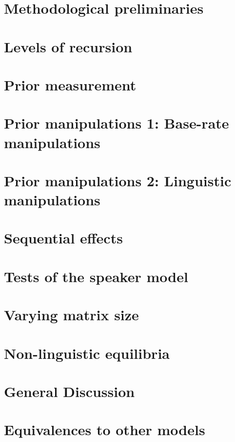 \documentclass[man,noapacite]{apa2}
\begin{document}
\section{Methodological preliminaries}



\section{Levels of recursion}

\section{Prior measurement}

\section{Prior manipulations 1: Base-rate manipulations}




\section{Prior manipulations 2: Linguistic manipulations}

\section{Sequential effects}

\section{Tests of the speaker model}

\section{Varying matrix size}

\section{Non-linguistic equilibria}



\section{General Discussion}


\newpage




\theappendix

\section{Equivalences to other models}

\end{document}
